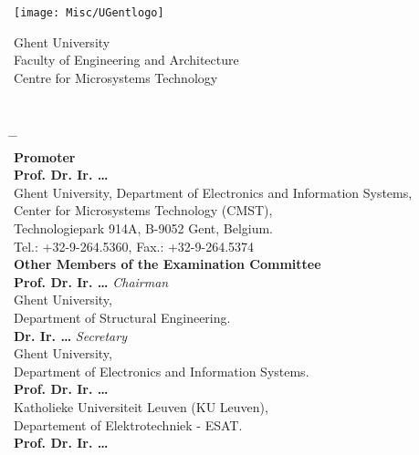 \thispagestyle{empty}

\normalsize

\noindent
\begin{minipage}{3cm}%
  \texttt{[image: Misc/UGentlogo]}%
\end{minipage}\hfill
\begin{minipage}{8cm}
\raggedleft
\textsf{Ghent University\\
Faculty of Engineering and Architecture\\
Centre for Microsystems Technology}
\end{minipage}
\\[-1cm]

\begin{tabbing}
\hspace*{1.5em} \= \hspace{1.5em} \= \hspace{13em}\=\\
\textsf{\textbf{\color{specialblue}Promoter}}\\
\>\textbf{Prof. Dr. Ir. \ldots}\\ 
\>\> \small Ghent University, Department of Electronics and Information Systems,\\
\>\> \small Center for Microsystems Technology (CMST),\\
\>\> \small Technologiepark 914A, B-9052 Gent, Belgium.\\
\>\> \small Tel.: +32-9-264.5360, Fax.: +32-9-264.5374\\
\textsf{\textbf{\color{specialblue}Other Members of the Examination Committee}}\\
\> \textbf{Prof. Dr. Ir. \ldots} \>\> \textit{Chairman}\\
\>\> \small Ghent University,\\
\>\> \small Department of Structural Engineering.\\
\> \textbf{Dr. Ir. \ldots} \>\> \textit{Secretary}\\
\>\> \small Ghent University,\\
\>\> \small Department of Electronics and Information Systems.\\
\> \textbf{Prof. Dr. Ir. \ldots} \\%
\>\> \small Katholieke Universiteit Leuven (KU Leuven), \\
\>\> \small Departement of Elektrotechniek - ESAT. \\
\> \textbf{Prof. Dr. Ir. \ldots} \\%

\end{tabbing}
